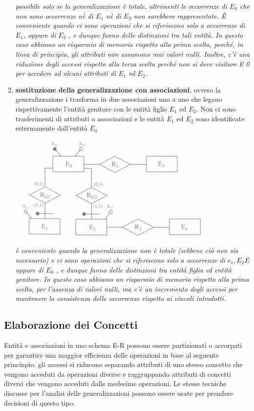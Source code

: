 \documentclass[a4paper,12pt, oneside]{book}
\begin{document}
\begin{enumerate}
\begin{center}
  \end{center}
  \textit{possibile solo se la generalizzazione è totale, altrimenti le
    occorrenze di $E_0$ che non sono occorrenze nè di $E_1$ nè di $E_2$ non sarebbero
rappresentate. È conveniente quando ci sono operazioni che si riferiscono solo
a occorrenze di $E_1$, oppure di $E_2$ , e dunque fanno delle distinzioni tra tali entità.
In questo caso abbiamo un risparmio di memoria rispetto alla prima scelta, perché,
in linea di principio, gli attributi non assumono mai valori nulli. Inoltre, c'è una
riduzione degli accessi rispetto alla terza scelta perché non si deve visitare E 0 per
accedere ad alcuni attributi di $E_1$ ed $E_2$.}
\item \textbf{sostituzione della generalizzazione con associazioni}, ovvero la generalizzazione
  i trasforma in due associazioni uno a uno che legano rispettivamente l'entità
genitore con le entità figlie $E_1$ ed $E_2$. Non ci sono trasferimenti di attributi o
associazioni e le entità $E_1$ ed $E_2$ sono identificate esternamente dall'entità $E_0$
  \begin{center}
  \includegraphics[scale=1]{img/genr4.png}
  \end{center}
  \textit{è conveniente quando la generalizzazione non è totale (sebbene
  ciò non sia necessario) e ci sono operazioni che si riferiscono solo a occorrenze
  di  $e_1, E_2E$ oppure di $E_0$ , e dunque fanno delle distinzioni tra entità figlia ed
  entità genitore. In questo caso abbiamo un risparmio di memoria rispetto alla prima
  scelta, per l'assenza di valori nulli, ma c'è un incremento degli accessi per
  mantenere la consistenza delle occorrenze rispetto ai vincoli introdotti.}
\end{enumerate}
\subsection{Elaborazione dei Concetti}
Entità e associazioni in uno schema E-R possono essere partizionati o accorpati
per garantire una maggior efficienza delle operazioni in base al seguente princinpio:
gli accessi si riducono separando attributi di uno stesso concetto che vengono
acceduti da operazioni diverse e raggruppando attributi di concetti diversi che vengono
acceduti dalle medesime operazioni. Le stesse tecniche discusse per l'analisi
delle generalizzazioni possono essere usate per prendere decisioni di questo tipo.
\end{document}
